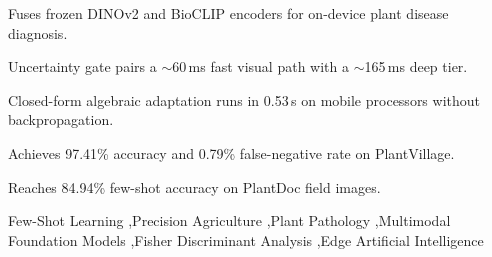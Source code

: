 \begin{frontmatter}
\begin{highlights}
\item Fuses frozen DINOv2 and BioCLIP encoders for on-device plant disease diagnosis.
\item Uncertainty gate pairs a $\sim$60\,ms fast visual path with a $\sim$165\,ms deep tier.
\item Closed-form algebraic adaptation runs in 0.53\,s on mobile processors without backpropagation.
\item Achieves 97.41\% accuracy and 0.79\% false-negative rate on PlantVillage.
\item Reaches 84.94\% few-shot accuracy on PlantDoc field images.
\end{highlights}

\begin{keyword}
Few-Shot Learning \sep Precision Agriculture \sep Plant Pathology \sep Multimodal Foundation Models \sep Fisher Discriminant Analysis \sep Edge Artificial Intelligence
\end{keyword}

\end{frontmatter}
